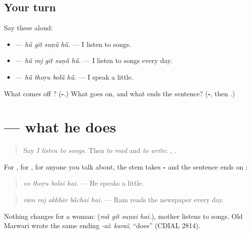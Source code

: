 \subsection*{Your turn}
Say these aloud:

\begin{itemize}
\raggedright
  \item \textbf{   } — \emph{hū̃ gīt suṇū̃ hū̃.} — I listen to songs.
  \item \textbf{    } — \emph{hū̃ roj gīt suṇū̃ hū̃.} — I listen to songs every day.
  \item \textbf{   } — \emph{hū̃ thoṛu bolū̃ hū̃.} — I speak a little.
\end{itemize}

\begin{tcolorbox}[breakable,colback=teal!4,colframe=teal!35!black,title={Before you move on}]
What comes off \textbf{}? (\textbf{-}.) What goes on, and what ends the sentence? (\textbf{-}, then \textbf{}.)
\end{tcolorbox}
\section[\texorpdfstring{\mw{बोलै} \mw{है} (bolai hai)}{बोलै है (bolai hai)}]{   — what he does}

\label{lesson:MW-C154-bolai-hai}



\begin{quote}
Say \emph{I listen to songs}. Then \emph{to read} and \emph{to write}: \textbf{}, \textbf{}.
\end{quote}

\begin{grammarlens}[title={Grammar Lens: -\mw{ै} and \mw{है}}]
For \textbf{}, for \textbf{}, for anyone you talk about, the stem takes \textbf{-} and the sentence ends on \textbf{}:

\begin{quote}
\textbf{   }
\end{quote}

\begin{quote}
\emph{vo thoṛu bolai hai.} — He speaks a little.
\end{quote}

\begin{quote}
\textbf{    }
\end{quote}

\begin{quote}
\emph{rām roj akhbār bā̃chai hai.} — Ram reads the newspaper every day.
\end{quote}

Nothing changes for a woman: \textbf{   } (\emph{mā̃ gīt suṇai hai.}), mother listens to songs. Old Marwari wrote the same ending \emph{-aï}: \emph{karaï}, \textquotedblleft{}does\textquotedblright{} (CDIAL 2814).
\end{grammarlens}

